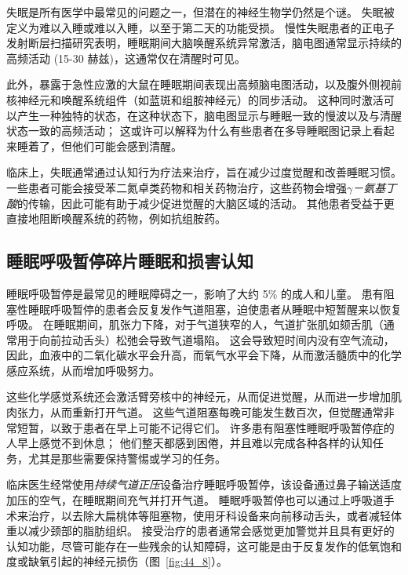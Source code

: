 失眠是所有医学中最常见的问题之一，但潜在的神经生物学仍然是个谜。
失眠被定义为难以入睡或难以入睡，以至于第二天的功能受损。
慢性失眠患者的正电子发射断层扫描研究表明，睡眠期间大脑唤醒系统异常激活，脑电图通常显示持续的高频活动 (15-30 赫兹)，这通常仅在清醒时可见。


此外，暴露于急性应激的大鼠在睡眠期间表现出高频脑电图活动，以及腹外侧视前核神经元和唤醒系统组件（如蓝斑和组胺神经元）的同步活动。
这种同时激活可以产生一种独特的状态，在这种状态下，脑电图显示与睡眠一致的慢波以及与清醒状态一致的高频活动；
这或许可以解释为什么有些患者在多导睡眠图记录上看起来睡着了，但他们可能会感到清醒。


临床上，失眠通常通过认知行为疗法来治疗，旨在减少过度觉醒和改善睡眠习惯。
一些患者可能会接受苯二氮卓类药物和相关药物治疗，这些药物会增强\textit{$\gamma$－氨基丁酸}的传输，因此可能有助于减少促进觉醒的大脑区域的活动。
其他患者受益于更直接地阻断唤醒系统的药物，例如抗组胺药。



\subsection{睡眠呼吸暂停碎片睡眠和损害认知}

睡眠呼吸暂停是最常见的睡眠障碍之一，影响了大约 5\% 的成人和儿童。
患有阻塞性睡眠呼吸暂停的患者会反复发作气道阻塞，迫使患者从睡眠中短暂醒来以恢复呼吸。
在睡眠期间，肌张力下降，对于气道狭窄的人，气道扩张肌如颏舌肌（通常用于向前拉动舌头）松弛会导致气道塌陷。
这会导致短时间内没有空气流动，因此，血液中的二氧化碳水平会升高，而氧气水平会下降，从而激活髓质中的化学感应系统，从而增加呼吸努力。


这些化学感觉系统还会激活臂旁核中的神经元，从而促进觉醒，从而进一步增加肌肉张力，从而重新打开气道。
这些气道阻塞每晚可能发生数百次，但觉醒通常非常短暂，以致于患者在早上可能不记得它们。
许多患有阻塞性睡眠呼吸暂停症的人早上感觉不到休息；
他们整天都感到困倦，并且难以完成各种各样的认知任务，尤其是那些需要保持警惕或学习的任务。


临床医生经常使用\textit{持续气道正压}设备治疗睡眠呼吸暂停，该设备通过鼻子输送适度加压的空气，在睡眠期间充气并打开气道。
睡眠呼吸暂停也可以通过上呼吸道手术来治疗，以去除大扁桃体等阻塞物，使用牙科设备来向前移动舌头，或者减轻体重以减少颈部的脂肪组织。
接受治疗的患者通常会感觉更加警觉并且具有更好的认知功能，尽管可能存在一些残余的认知障碍，这可能是由于反复发作的低氧饱和度或缺氧引起的神经元损伤（图~\ref{fig:44_8}）。


